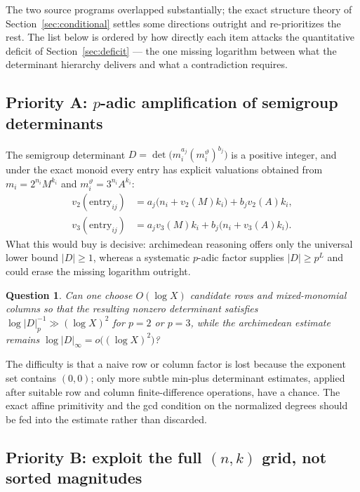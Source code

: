 \documentclass[11pt,oneside]{article}
\newtheorem{question}[theorem]{Question}
\theoremstyle{definition}
\theoremstyle{remark}
\newcommand{\thetaq}{\vartheta}
\newcommand{\vpp}[2]{v_{#1}\!\left(#2\right)}
\begin{document}
The two source programs overlapped substantially; the exact structure theory of
Section~\ref{sec:conditional} settles some directions outright and re-prioritizes the rest.
The list below is ordered by how directly each item attacks the quantitative deficit of
Section~\ref{sec:deficit} --- the one missing logarithm between what the determinant
hierarchy delivers and what a contradiction requires.

\subsection{Priority A: \texorpdfstring{$p$}{p}-adic amplification of semigroup determinants}
\label{at:prog-padic}

The semigroup determinant $D=\det\bigl(m_i^{a_j}(m_i^{\thetaq})^{b_j}\bigr)$ is a positive
integer, and under the exact monoid every entry has explicit valuations obtained from
$m_i=2^{n_i}M^{k_i}$ and $m_i^{\thetaq}=3^{n_i}A^{k_i}$:
\begin{align*}
  \vpp{2}{\text{entry}_{ij}}&=a_j\bigl(n_i+\vpp{2}{M}k_i\bigr)+b_j\vpp{2}{A}k_i,\\
  \vpp{3}{\text{entry}_{ij}}&=a_j\vpp{3}{M}k_i+b_j\bigl(n_i+\vpp{3}{A}k_i\bigr).
\end{align*}
What this would buy is decisive: archimedean reasoning offers only the universal lower bound
$|D|\ge1$, whereas a systematic $p$-adic factor supplies $|D|\ge p^{L}$ and could erase the
missing logarithm outright.

\begin{question}
\label{at:q-padic}
Can one choose $O(\log X)$ candidate rows and mixed-monomial columns so that the resulting
nonzero determinant satisfies $\log|D|_p^{-1}\gg(\log X)^2$ for $p=2$ or $p=3$, while the
archimedean estimate remains $\log|D|_\infty=o\bigl((\log X)^2\bigr)$?
\end{question}

The difficulty is that a naive row or column factor is lost because the exponent set contains
$(0,0)$; only more subtle min-plus determinant estimates, applied after suitable row and
column finite-difference operations, have a chance.  The exact affine primitivity and the
gcd condition on the normalized degrees should be fed into the estimate rather than
discarded.

\subsection{Priority B: exploit the full \texorpdfstring{$(n,k)$}{(n,k)} grid, not sorted magnitudes}
\label{at:prog-grid}
\end{document}
